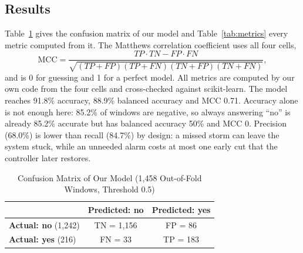 \documentclass[conference,a4paper]{IEEEtran}
\begin{document}
\subsection{Results}
Table~\ref{tab:cm} gives the confusion matrix of our model and Table~\ref{tab:metrics} every metric computed from it. The Matthews correlation coefficient uses all four cells,
\begin{equation}
\text{MCC} = \frac{TP\cdot TN - FP\cdot FN}{\sqrt{(TP+FP)(TP+FN)(TN+FP)(TN+FN)}},
\label{eq:mcc}
\end{equation}
and is 0 for guessing and 1 for a perfect model. All metrics are computed by our own code from the four cells and cross-checked against scikit-learn. The model reaches 91.8\% accuracy, 88.9\% balanced accuracy and MCC 0.71. Accuracy alone is not enough here: 85.2\% of windows are negative, so always answering ``no'' is already 85.2\% accurate but has balanced accuracy 50\% and MCC 0. Precision (68.0\%) is lower than recall (84.7\%) by design: a missed storm can leave the system stuck, while an unneeded alarm costs at most one early cut that the controller later restores.

\begin{table}[!t]
\caption{Confusion Matrix of Our Model (1,458 Out-of-Fold Windows, Threshold 0.5)}
\label{tab:cm}
\centering
\small
\begin{tabular}{|l|c|c|}
\hline
 & \textbf{Predicted: no} & \textbf{Predicted: yes} \\ \hline
\textbf{Actual: no} (1,242) & TN = 1,156 & FP = 86 \\ \hline
\textbf{Actual: yes} (216) & FN = 33 & TP = 183 \\ \hline
\end{tabular}
\end{table}
\end{document}
